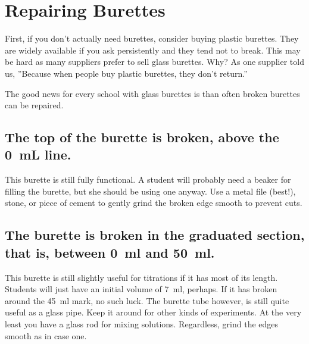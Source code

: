 \chapter{Repairing Burettes}
\label{cha:burettes}

First, if you don't actually need burettes, consider buying plastic burettes. They are widely available if you ask persistently and they tend not to break. This may be hard as many suppliers prefer to sell glass burettes. Why? As one supplier told us, ''Because when people buy plastic burettes, they don’t return.''

The good news for every school with glass burettes is than often broken burettes can be repaired.

\section{The top of the burette is broken, 
above the 0~mL line.}

This burette is still fully functional. 
A student will probably need a beaker for filling the burette, 
but she should be using one anyway. 
Use a metal file (best!), 
stone, 
or piece of cement to gently grind the broken edge smooth to prevent cuts.

\section{The burette is broken in the graduated section, 
that is, 
between 0~ml and 50~ml.}
This burette is still slightly useful for titrations 
if it has most of its length. 
Students will just have an initial volume of 7~ml, 
perhaps. 
If it has broken around the 45~ml mark, 
no such luck. 
The burette tube however, 
is still quite useful as a glass pipe. 
Keep it around for other kinds of experiments. 
At the very least you have a glass rod for mixing solutions. 
Regardless, 
grind the edges smooth as in case one.

